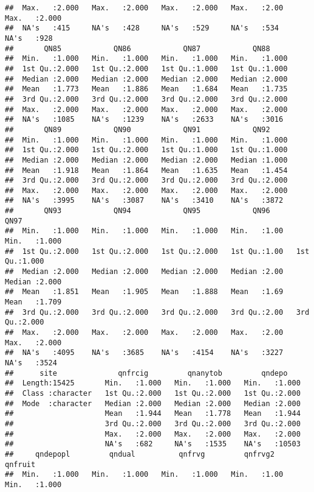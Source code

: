 \documentclass[
]{article}
\begin{document}
\begin{verbatim}
##  Max.   :2.000   Max.   :2.000   Max.   :2.000   Max.   :2.00   Max.   :2.000  
##  NA's   :415     NA's   :428     NA's   :529     NA's   :534    NA's   :928    
##       QN85            QN86            QN87            QN88      
##  Min.   :1.000   Min.   :1.000   Min.   :1.000   Min.   :1.000  
##  1st Qu.:2.000   1st Qu.:2.000   1st Qu.:1.000   1st Qu.:1.000  
##  Median :2.000   Median :2.000   Median :2.000   Median :2.000  
##  Mean   :1.773   Mean   :1.886   Mean   :1.684   Mean   :1.735  
##  3rd Qu.:2.000   3rd Qu.:2.000   3rd Qu.:2.000   3rd Qu.:2.000  
##  Max.   :2.000   Max.   :2.000   Max.   :2.000   Max.   :2.000  
##  NA's   :1085    NA's   :1239    NA's   :2633    NA's   :3016   
##       QN89            QN90            QN91            QN92      
##  Min.   :1.000   Min.   :1.000   Min.   :1.000   Min.   :1.000  
##  1st Qu.:2.000   1st Qu.:2.000   1st Qu.:1.000   1st Qu.:1.000  
##  Median :2.000   Median :2.000   Median :2.000   Median :1.000  
##  Mean   :1.918   Mean   :1.864   Mean   :1.635   Mean   :1.454  
##  3rd Qu.:2.000   3rd Qu.:2.000   3rd Qu.:2.000   3rd Qu.:2.000  
##  Max.   :2.000   Max.   :2.000   Max.   :2.000   Max.   :2.000  
##  NA's   :3995    NA's   :3087    NA's   :3410    NA's   :3872   
##       QN93            QN94            QN95            QN96           QN97      
##  Min.   :1.000   Min.   :1.000   Min.   :1.000   Min.   :1.00   Min.   :1.000  
##  1st Qu.:2.000   1st Qu.:2.000   1st Qu.:2.000   1st Qu.:1.00   1st Qu.:1.000  
##  Median :2.000   Median :2.000   Median :2.000   Median :2.00   Median :2.000  
##  Mean   :1.851   Mean   :1.905   Mean   :1.888   Mean   :1.69   Mean   :1.709  
##  3rd Qu.:2.000   3rd Qu.:2.000   3rd Qu.:2.000   3rd Qu.:2.00   3rd Qu.:2.000  
##  Max.   :2.000   Max.   :2.000   Max.   :2.000   Max.   :2.00   Max.   :2.000  
##  NA's   :4095    NA's   :3685    NA's   :4154    NA's   :3227   NA's   :3524   
##      site              qnfrcig         qnanytob         qndepo     
##  Length:15425       Min.   :1.000   Min.   :1.000   Min.   :1.000  
##  Class :character   1st Qu.:2.000   1st Qu.:2.000   1st Qu.:2.000  
##  Mode  :character   Median :2.000   Median :2.000   Median :2.000  
##                     Mean   :1.944   Mean   :1.778   Mean   :1.944  
##                     3rd Qu.:2.000   3rd Qu.:2.000   3rd Qu.:2.000  
##                     Max.   :2.000   Max.   :2.000   Max.   :2.000  
##                     NA's   :682     NA's   :1535    NA's   :10503  
##     qndepopl         qndual          qnfrvg         qnfrvg2        qnfruit     
##  Min.   :1.000   Min.   :1.000   Min.   :1.000   Min.   :1.00   Min.   :1.000  

\end{verbatim}
\end{document}
